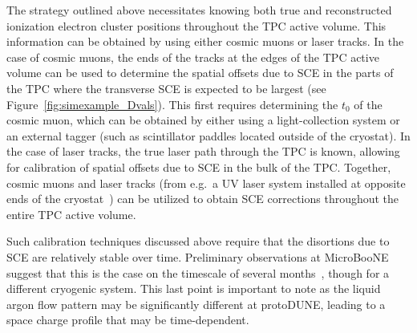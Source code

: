 The strategy outlined above necessitates knowing both true and reconstructed ionization electron cluster positions throughout the TPC active volume.  This information can be obtained by using either cosmic muons or laser tracks.  In the case of cosmic muons, the ends of the tracks at the edges of the TPC active volume can be used to determine the spatial offsets due to SCE in the parts of the TPC where the transverse SCE is expected to be largest (see Figure~\ref{fig:simexample_Dvals}).  This first requires determining the $t_0$ of the cosmic muon, which can be obtained by either using a light-collection system or an external tagger (such as scintillator paddles located outside of the cryostat).  In the case of laser tracks, the true laser path through the TPC is known, allowing for calibration of spatial offsets due to SCE in the bulk of the TPC.  Together, cosmic muons and laser tracks (from e.g.\ a UV laser system installed at opposite ends of the cryostat~\cite{Ereditato:2014lra}) can be utilized to obtain SCE corrections throughout the entire TPC active volume.

Such calibration techniques discussed above require that the disortions due to SCE are relatively stable over time.  Preliminary observations at MicroBooNE suggest that this is the case on the timescale of several months~\cite{SCEnoteMicroBooNE}, though for a different cryogenic system.  This last point is important to note as the liquid argon flow pattern may be significantly different at protoDUNE, leading to a space charge profile that may be time-dependent.

